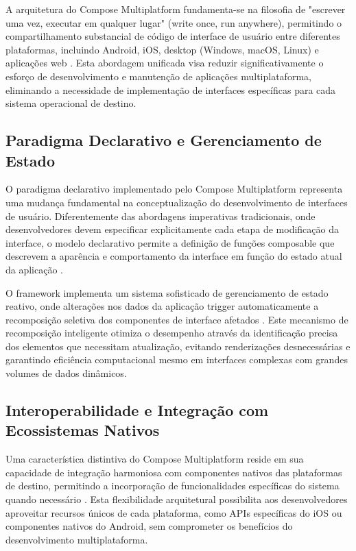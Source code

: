 A arquitetura do Compose Multiplatform fundamenta-se na filosofia de "escrever uma vez, executar em qualquer lugar" (write once, run anywhere), permitindo o compartilhamento substancial de código de interface de usuário entre diferentes plataformas, incluindo Android, iOS, desktop (Windows, macOS, Linux) e aplicações web \cite{kotlin2023multiplatform}. Esta abordagem unificada visa reduzir significativamente o esforço de desenvolvimento e manutenção de aplicações multiplataforma, eliminando a necessidade de implementação de interfaces específicas para cada sistema operacional de destino.

\subsection{Paradigma Declarativo e Gerenciamento de Estado}

O paradigma declarativo implementado pelo Compose Multiplatform representa uma mudança fundamental na conceptualização do desenvolvimento de interfaces de usuário. Diferentemente das abordagens imperativas tradicionais, onde desenvolvedores devem especificar explicitamente cada etapa de modificação da interface, o modelo declarativo permite a definição de funções composable que descrevem a aparência e comportamento da interface em função do estado atual da aplicação \cite{gamma2023reactive}.

O framework implementa um sistema sofisticado de gerenciamento de estado reativo, onde alterações nos dados da aplicação trigger automaticamente a recomposição seletiva dos componentes de interface afetados \cite{compose2023state}. Este mecanismo de recomposição inteligente otimiza o desempenho através da identificação precisa dos elementos que necessitam atualização, evitando renderizações desnecessárias e garantindo eficiência computacional mesmo em interfaces complexas com grandes volumes de dados dinâmicos.

\subsection{Interoperabilidade e Integração com Ecossistemas Nativos}

Uma característica distintiva do Compose Multiplatform reside em sua capacidade de integração harmoniosa com componentes nativos das plataformas de destino, permitindo a incorporação de funcionalidades específicas do sistema quando necessário \cite{jetbrains2023interop}. Esta flexibilidade arquitetural possibilita aos desenvolvedores aproveitar recursos únicos de cada plataforma, como APIs específicas do iOS ou componentes nativos do Android, sem comprometer os benefícios do desenvolvimento multiplataforma.

